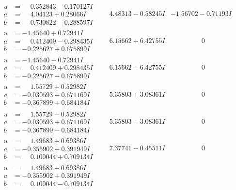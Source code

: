 \documentclass[1p]{elsarticle_modified}
\theoremstyle{definition}
\begin{document}
$$\begin{array}{c|c|c}
\begin{aligned}
u &= \phantom{-}0.352843 - 0.170127 I \\
a &= \phantom{-}4.04123 + 0.28066 I \\
b &= \phantom{-}0.730822 - 0.288597 I\end{aligned}
 & \phantom{-}4.48313 - 0.58245 I & -1.56702 - 0.71193 I \\ \hline\begin{aligned}
u &= -1.45640 + 0.72941 I \\
a &= \phantom{-}0.412409 - 0.298435 I \\
b &= -0.225627 + 0.675899 I\end{aligned}
 & \phantom{-}6.15662 + 6.42755 I & \phantom{-0.000000 } 0 \\ \hline\begin{aligned}
u &= -1.45640 - 0.72941 I \\
a &= \phantom{-}0.412409 + 0.298435 I \\
b &= -0.225627 - 0.675899 I\end{aligned}
 & \phantom{-}6.15662 - 6.42755 I & \phantom{-0.000000 } 0 \\ \hline\begin{aligned}
u &= \phantom{-}1.55729 + 0.52982 I \\
a &= -0.030593 - 0.671169 I \\
b &= -0.367899 + 0.684184 I\end{aligned}
 & \phantom{-}5.35803 + 3.08361 I & \phantom{-0.000000 } 0 \\ \hline\begin{aligned}
u &= \phantom{-}1.55729 - 0.52982 I \\
a &= -0.030593 + 0.671169 I \\
b &= -0.367899 - 0.684184 I\end{aligned}
 & \phantom{-}5.35803 - 3.08361 I & \phantom{-0.000000 } 0 \\ \hline\begin{aligned}
u &= \phantom{-}1.49683 + 0.69386 I \\
a &= -0.355902 - 0.391949 I \\
b &= \phantom{-}0.100044 + 0.709134 I\end{aligned}
 & \phantom{-}7.37741 - 0.45511 I & \phantom{-0.000000 } 0 \\ \hline\begin{aligned}
u &= \phantom{-}1.49683 - 0.69386 I \\
a &= -0.355902 + 0.391949 I \\
b &= \phantom{-}0.100044 - 0.709134 I\end{aligned}

\end{array}$$
\end{document}
